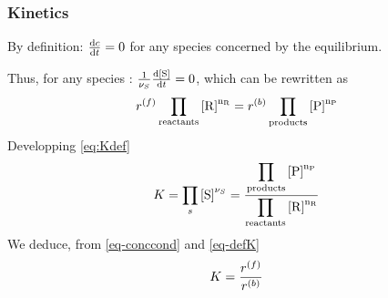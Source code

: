 \subsubsection{Kinetics}
\label{demo-eqrate}

By definition: $\frac{\dd \conc}{\dd t} = 0$ for any species concerned by the equilibrium.

Thus, for any species : 
$\frac{1}{\scoef[S]}\frac{\dd\conc[S]}{\dd t} =  0$, which can be rewritten as
\begin{equation}
\fwdrate \prodReac = \bkwdrate \prodProd
\label{eq-conccond}
\end{equation}
Developping \ref{eq:Kdef}
\begin{equation}
\Eqconst = \prod_{s}\conc[S]^{\scoef[S]} 
          = \frac{\displaystyle\prodProd}
                 {\displaystyle\prodReac}
\label{eq-defK}
\end{equation}
We deduce, from \ref{eq-conccond} and \ref{eq-defK}
\begin{equation}
\Eqconst = \frac{\fwdrate}{\bkwdrate}
\end{equation}
